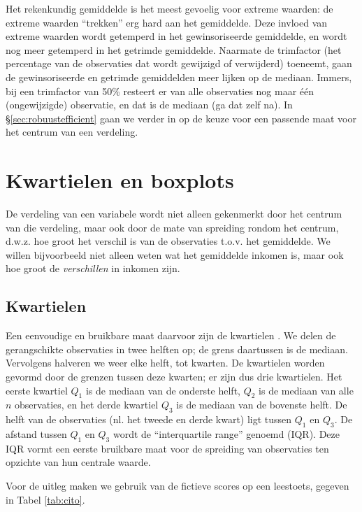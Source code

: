 \documentclass[
]{book}
\begin{document}
Het rekenkundig gemiddelde is het meest gevoelig voor extreme waarden:
de extreme waarden ``trekken'' erg hard aan het gemiddelde. Deze invloed
van extreme waarden wordt getemperd in het gewinsoriseerde gemiddelde,
en wordt nog meer getemperd in het getrimde gemiddelde. Naarmate de
trimfactor (het percentage van de observaties dat wordt gewijzigd of
verwijderd) toeneemt, gaan de gewinsoriseerde en getrimde gemiddelden
meer lijken op de mediaan. Immers, bij een trimfactor van 50\% resteert
er van alle observaties nog maar één (ongewijzigde) observatie, en dat
is de mediaan (ga dat zelf na). In
§\ref{sec:robuustefficient} gaan we verder in op de keuze voor een
passende maat voor het centrum van een verdeling.

\section{Kwartielen en boxplots}\label{sec:kwartielen-en-boxplots}

De verdeling van een variabele wordt niet alleen gekenmerkt door het
centrum van die verdeling, maar ook door de mate van spreiding rondom
het centrum, d.w.z. hoe groot het verschil is van de observaties t.o.v.
het gemiddelde. We willen bijvoorbeeld niet alleen weten wat het
gemiddelde inkomen is, maar ook hoe groot de \emph{verschillen} in inkomen
zijn.

\subsection{Kwartielen}\label{kwartielen}

Een eenvoudige en bruikbare maat daarvoor zijn de kwartielen \citep{Tukey77}.
We delen de gerangschikte observaties in twee helften op; de grens
daartussen is de mediaan. Vervolgens halveren we weer elke helft, tot
kwarten. De kwartielen worden gevormd door de grenzen tussen deze
kwarten; er zijn dus drie kwartielen. Het eerste kwartiel \(Q_1\) is de
mediaan van de onderste helft, \(Q_2\) is de mediaan van alle \(n\)
observaties, en het derde kwartiel \(Q_3\) is de mediaan van de bovenste
helft. De helft van de observaties (nl. het tweede en derde kwart) ligt
tussen \(Q_1\) en \(Q_3\). De afstand tussen \(Q_1\) en \(Q_3\) wordt de
``interquartile range'' genoemd (IQR). Deze IQR vormt een eerste bruikbare
maat voor de spreiding van observaties ten opzichte van hun centrale
waarde.

Voor de uitleg maken we gebruik van de fictieve scores op een leestoets,
gegeven in Tabel \ref{tab:cito}.
\end{document}
